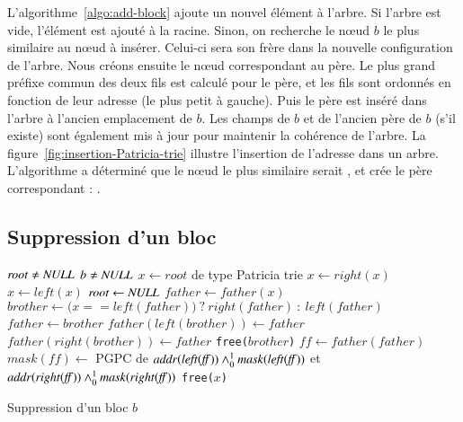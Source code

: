 


L'algorithme~\ref{algo:add-block} ajoute un nouvel élément à l'arbre.
Si l'arbre est vide, l'élément est ajouté à la racine.
Sinon, on recherche le n\oe{}ud $b$ le plus similaire au n\oe{}ud à insérer.
Celui-ci sera son frère dans la nouvelle configuration de l'arbre.
Nous créons ensuite le n\oe{}ud correspondant au père.
Le plus grand préfixe commun des deux fils est calculé pour le père, et les fils
sont ordonnés en fonction de leur adresse (le plus petit à gauche).
Puis le père est inséré dans l'arbre à l'ancien emplacement de $b$.
Les champs de $b$ et de l'ancien père de $b$ (s'il existe) sont également mis à
jour pour maintenir la cohérence de l'arbre.
La figure~\ref{fig:insertion-Patricia-trie} illustre l'insertion de l'adresse
 dans un arbre.
L'algorithme a déterminé que le n\oe{}ud le plus similaire serait
, et crée le père correspondant :
.


\subsection{Suppression d'un bloc}

\begin{algorithm}[h!]
\begin{algorithmic}
\Require $\mathit{root} \neq \mathit{NULL}$
\Require $b \neq \mathit{NULL}$
\State $x \gets \mathit{root}$ de type Patricia trie
    \State $x \gets \mathit{right(x)}$
  \Else
    \State $x \gets \mathit{left(x)}$
  \EndIf
\EndWhile
{}
  \State $\mathit{root} \gets \mathit{NULL}$
\Else
  \State $\mathit{father} \gets \mathit{father(x)}$
  \State $\mathit{brother} \gets (x == \mathit{left(father))} ~?~ \mathit{right(father)} ~:~ \mathit{left(father)}$
  \State $\mathit{father} \gets \mathit{brother}$
    \State $\mathit{father(left(brother))} \gets \mathit{father}$
    \State $\mathit{father(right(brother))} \gets \mathit{father}$
  \EndIf
  \State \lstinline'free('$\mathit{brother}$\lstinline')'
  \State $\mathit{ff} \gets \mathit{father(father)}$
    \State $\mathit{mask(ff)} \gets$ PGPC de $\mathit{addr(left(ff))} \land_0^1 \mathit{mask(left(ff))}$ et $\mathit{addr(right(ff))} \land_0^1 \mathit{mask(right(ff))}$
  \EndIf
\EndIf
\State \lstinline'free('$x$\lstinline')'
\end{algorithmic}
\caption{Suppression d'un bloc $b$
  \label{algo:rem-block}}
\end{algorithm}

